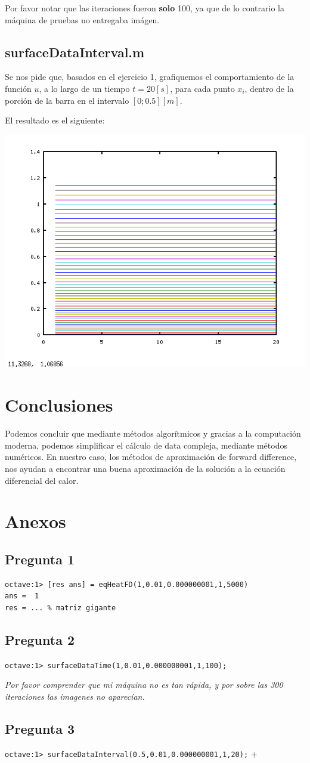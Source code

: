 \documentclass[12pt,letterpaper]{article}
\begin{document}
Por favor notar que las iteraciones fueron \textbf{solo} 100, ya que de lo contrario la máquina de pruebas no entregaba imágen.

\subsection{surfaceDataInterval.m}
Se nos pide que, basados en el ejercicio 1, grafiquemos el comportamiento de la función $u$, a lo largo de un tiempo $t=20[s]$, para cada punto $x_i$, dentro de la porción de la barra en el intervalo $[0;0.5][m]$.

El resultado es el siguiente:

\includegraphics[width=\textwidth]{./pregunta3.png}
\section{Conclusiones}
Podemos concluir que mediante métodos algorítmicos y gracias a la computación moderna, podemos simplificar el cálculo de data compleja, mediante métodos numéricos. En nuestro caso, los métodos de aproximación de forward difference, nos ayudan a encontrar una buena aproximación de la solución a la ecuación diferencial del calor.
\newpage
\section{Anexos}
\subsection{Pregunta 1}
\begin{verbatim} 
octave:1> [res ans] = eqHeatFD(1,0.01,0.000000001,1,5000)
ans =  1
res = ... % matriz gigante
\end{verbatim}
\subsection{Pregunta 2}
\verb+octave:1> surfaceDataTime(1,0.01,0.000000001,1,100);+

\textit{Por favor comprender que mi máquina no es tan rápida, y por sobre las 300 iteraciones las imagenes no aparecían.}
\subsection{Pregunta 3}
\verb+octave:1> surfaceDataInterval(0.5,0.01,0.000000001,1,20);+
+
\end{document}
